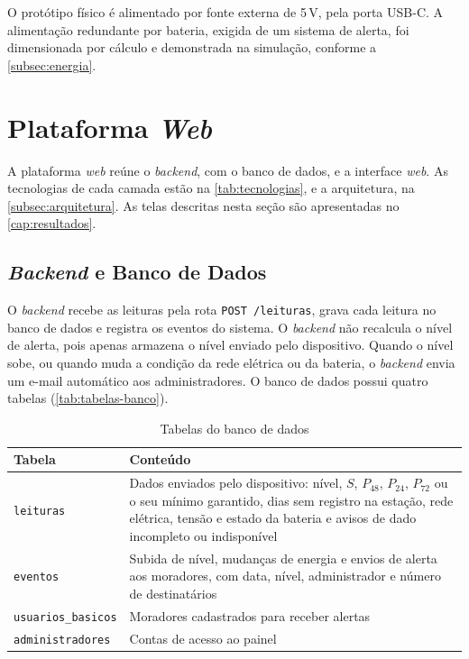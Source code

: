 O protótipo físico é alimentado por fonte externa de 5\,V, pela porta
USB-C. A alimentação redundante por bateria, exigida de um sistema de
alerta, foi dimensionada por cálculo e demonstrada na simulação, conforme
a \autoref{subsec:energia}.

\section{Plataforma \textit{Web}}
\label{sec:software}

A plataforma \textit{web} reúne o \textit{backend}, com o banco de dados,
e a interface \textit{web}. As tecnologias de cada camada estão na
\autoref{tab:tecnologias}, e a arquitetura, na
\autoref{subsec:arquitetura}. As telas descritas nesta seção são
apresentadas no \autoref{cap:resultados}.

\subsection{\textit{Backend} e Banco de Dados}
\label{subsec:backend}

O \textit{backend} recebe as leituras pela rota \texttt{POST
/leituras}, grava cada leitura no banco de dados e registra os eventos
do sistema. O \textit{backend} não recalcula o nível de alerta, pois apenas armazena o nível enviado pelo dispositivo.
Quando o nível sobe, ou quando muda a condição da rede elétrica ou da
bateria, o \textit{backend} envia um e-mail automático aos
administradores. O banco de dados possui quatro tabelas
(\autoref{tab:tabelas-banco}).

\begin{table}[H]
\centering
\caption{Tabelas do banco de dados}
\label{tab:tabelas-banco}
\begin{tabular}{p{3.8cm}p{10.8cm}}
\hline
\textbf{Tabela} & \textbf{Conteúdo} \\
\hline
\texttt{leituras} & Dados enviados pelo dispositivo: nível, $S$, $P_{48}$, $P_{24}$, $P_{72}$ ou o seu mínimo garantido, dias sem registro na estação, rede elétrica, tensão e estado da bateria e avisos de dado incompleto ou indisponível \\
\texttt{eventos} & Subida de nível, mudanças de energia e envios de alerta aos moradores, com data, nível, administrador e número de destinatários \\
\texttt{usuarios\_basicos} & Moradores cadastrados para receber alertas \\
\texttt{administradores} & Contas de acesso ao painel \\
\hline
\end{tabular}
\end{table}

